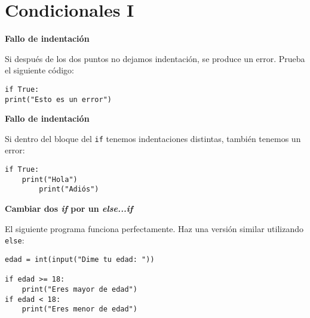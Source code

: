 \documentclass[a4paper, 11pt]{scrartcl}
\newenvironment{code}{\begin{tcolorbox}[colback=red!2!white]}{\end{tcolorbox}}
\begin{document}
\newpage

\section{Condicionales I}






\noindent\textbf{\sffamily Fallo de indentación}

Si después de los dos puntos no dejamos indentación, se produce un error. Prueba el siguiente código:

\smallskip

\begin{code}

\begin{verbatim}
if True:
print("Esto es un error")
\end{verbatim}

\end{code}







\noindent\textbf{\sffamily Fallo de indentación}

Si dentro del bloque del \verb|if| tenemos indentaciones distintas, también tenemos un error:

\smallskip

\begin{code}

\begin{verbatim}
if True:
	print("Hola")
		print("Adiós")
\end{verbatim}

\end{code}






\noindent\textbf{\sffamily Cambiar dos \textit{if} por un  \textit{else...if}}

El siguiente programa funciona perfectamente. Haz una versión similar utilizando \verb|else|:

\smallskip

\begin{code}

\begin{verbatim}
edad = int(input("Dime tu edad: "))

if edad >= 18:
	print("Eres mayor de edad")
if edad < 18:
	print("Eres menor de edad")
\end{verbatim}

\end{code}
\end{document}
